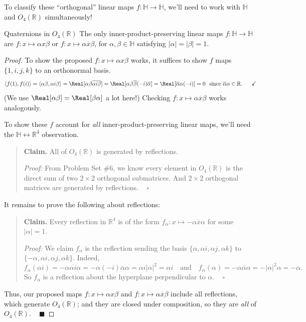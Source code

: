 To classify these ``orthogonal'' linear maps $f: \mathbb{H} \to \mathbb{H}$, we'll need to work with $\mathbb{H}$ and $O_4(\mathbb{R})$ simultaneously!

\begin{theorem}{Quaternions in $O_4(\mathbb{R})$}
    The only inner-product-preserving linear maps $f: \mathbb{H} \to \mathbb{H}$ are $f: x \mapsto \alpha x \beta$ or $f : x \mapsto \alpha \overline{x} \beta$, for $\alpha, \beta \in \mathbb{H}$ satisfying $|\alpha| = |\beta| = 1$.
\end{theorem}

\begin{proof}
    To show the proposed $f: x \mapsto \alpha x \beta$ works, it suffices to show $f$ maps $\{1, i, j, k\}$ to an orthonormal basis.
    \[ \langle f(1), f(i) \rangle = \langle \alpha \beta, \alpha i \beta \rangle = \Real[\alpha\beta  \overline{\alpha i \beta} ] = \Real[\alpha \beta \overline{\beta}(-i) \overline{\alpha}] = \Real [ \overline{\alpha} \alpha (-i)] = 0 ~ \text{ since } \overline{\alpha}\alpha \in \mathbb{R}. ~~~~~ \checkmark \]
    (We use $\Real[\alpha \beta ] = \Real [ \beta \alpha ]$ a lot here!) Checking $f: x \mapsto \alpha \overline{x} \beta$ works analogously.

    To show these $f$ account for \emph{all} inner-product-preserving linear maps, we'll need the $\mathbb{H} \leftrightarrow \mathbb{R}^4$ observation.
    \begin{quote}
        \textbf{Claim.} All of $O_4(\mathbb{R})$ is generated by reflections.

        \emph{Proof:} From Problem Set \#6, we know every element in $O_4(\mathbb{R})$ is the direct sum of two $2 \times 2$ orthogonal submatrices.  And $2 \times 2$ orthogonal matrices are generated by reflections. ~ $\square$
    \end{quote}
    It remains to prove the following about reflections:
    \begin{quote}
        \textbf{Claim.} Every reflection in $\mathbb{R}^4$ is of the form $f_{\alpha}: x \mapsto - \alpha \overline{x} \alpha$ for some $|\alpha| = 1$.

        \emph{Proof:} We claim $f_{\alpha}$ is the reflection sending the basis $\{\alpha, \alpha i, \alpha j, \alpha k\}$ to $\{- \alpha, \alpha i, \alpha j, \alpha k\}$.  Indeed,
        \[ f_{\alpha}(\alpha i) = - \alpha \overline{\alpha i} \alpha = - \alpha (-i) \overline{\alpha} \alpha = \alpha i |\alpha |^2 = \alpha i ~~~ \text{ and } ~~~ f_{\alpha}(\alpha) = - \alpha \overline{\alpha} \alpha = - |\alpha|^2 \alpha = -\alpha. \]
        So $f_{\alpha}$ is a reflection about the hyperplane perpendicular to $\alpha$. ~ $\square$
    \end{quote}
    Thus, our proposed maps $f: x \mapsto \alpha x \beta$ and $f: x \mapsto \alpha \overline{x} \beta$ include all reflections, which generate $O_4(\mathbb{R})$; and they are closed under composition, so they are \emph{all} of $O_4(\mathbb{R})$. ~ $\blacksquare$
\end{proof}

